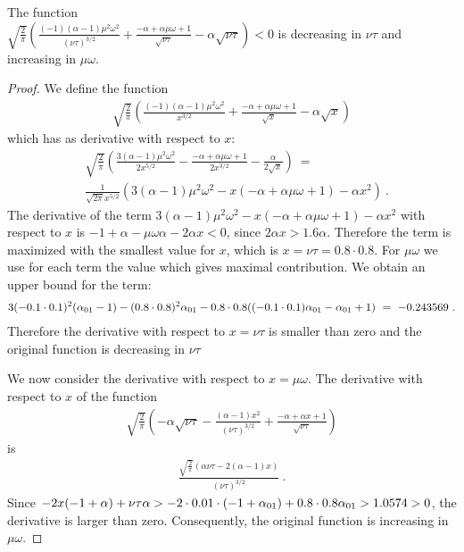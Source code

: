 \documentclass{article}
\begin{document}
\begin{lemma}
\label{lem:F4}

The function \\
$\sqrt{\frac{2}{\pi }} 
    \left(\frac{(-1) (\alpha -1) \mu^2 \omega^2}{(\nu \tau)^{3/2}} + 
    \frac{-\alpha + \alpha  \mu \omega+1}{\sqrt{\nu \tau}} - 
    \alpha  \sqrt{\nu \tau}\right)<0$ 
is decreasing in $\nu \tau$ and increasing in $\mu \omega$.
\end{lemma}
\begin{proof}
We define the function
\begin{align}
\sqrt{\frac{2}{\pi }} \left(\frac{(-1) (\alpha -1) \mu^2 \omega^2}{x^{3/2}}+\frac{-\alpha +\alpha  \mu \omega+1}{\sqrt{x}}-\alpha  \sqrt{x}\right)
\end{align}
which has as derivative with respect to $x$:
\begin{align}
&\sqrt{\frac{2}{\pi }} \left(\frac{3 (\alpha -1) \mu^2 \omega^2}{2
  x^{5/2}}-\frac{-\alpha +\alpha  \mu \omega+1}{2
  x^{3/2}}-\frac{\alpha }{2 \sqrt{x}}\right)
\ = \\\nonumber
&\frac{1}{\sqrt{2 \pi } x^{5/2}}
\left(3 (\alpha -1) \mu^2 \omega^2-x (-\alpha +\alpha  \mu
  \omega+1)-\alpha  x^2\right) \ .
\end{align}
The derivative of the term
$3 (\alpha -1) \mu^2 \omega^2-x (-\alpha +\alpha  \mu
\omega+1)-\alpha  x^2$
with respect to $x$ is 
$-1 +\alpha -\mu \omega \alpha -2 \alpha  x<0$, since
$2 \alpha  x > 1.6 \alpha$.
Therefore the term is maximized with the smallest value for $x$, which
is $x=\nu \tau=0.8 \cdot 0.8$.
For $\mu \omega$ we use for each term the value which gives maximal
contribution. We obtain an upper bound for the term:
\begin{align}
3 (-0.1 \cdot 0.1)^2 (\alpha_{\rm 01}-1)-(0.8 \cdot 0.8)^2 \alpha_{\rm 01}-0.8 \cdot 0.8 ((-0.1 \cdot 0.1) \alpha_{\rm 01}-\alpha_{\rm 01}+1) 
\ = \ -0.243569 \ .
\end{align}
Therefore the derivative with respect to $x=\nu \tau$ 
is smaller than zero and the original function is decreasing in $\nu \tau$

We now consider the derivative with respect to $x=\mu \omega$.
The derivative with respect to $x$ of the function
\begin{align}
\sqrt{\frac{2}{\pi }} \left(-\alpha  \sqrt{\nu \tau}-\frac{(\alpha -1) x^2}{(\nu \tau)^{3/2}}+\frac{-\alpha +\alpha  x+1}{\sqrt{\nu \tau}}\right)
\end{align}
is
\begin{align}
\frac{\sqrt{\frac{2}{\pi }} (\alpha  \nu \tau-2 (\alpha -1)
  x)}{(\nu \tau)^{3/2}} \ .
\end{align}
Since 
$-2 x (-1 + \alpha) + \nu \tau \alpha > -2 \cdot 0.01 \cdot  (-1 + \alpha_{\rm 01}) +
0.8 \cdot 0.8 \alpha_{\rm 01}>1.0574>0$, the derivative is larger than zero.
Consequently, the original function is increasing in  $\mu \omega$.


\end{proof}
\end{document}
